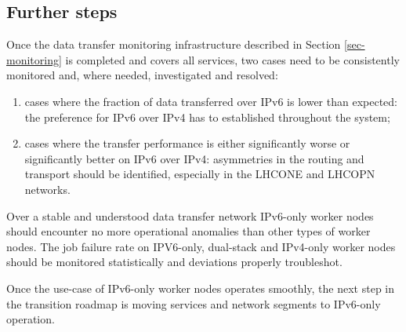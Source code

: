 \subsection{Further steps}
Once the data transfer monitoring infrastructure described in Section
\ref{sec-monitoring} is completed and covers all services, two cases
need to be consistently monitored and, where needed, investigated
and resolved:
\begin{enumerate}
\item cases where the fraction of data transferred over IPv6 is lower than expected:
the preference for IPv6 over IPv4 has to established throughout the system;
\item cases where the transfer performance is either significantly worse 
or significantly better on IPv6 over IPv4: asymmetries in the routing and
transport should be identified, especially in the LHCONE and LHCOPN networks.
\end{enumerate}
\par
Over a stable and understood data transfer network 
IPv6-only worker nodes should encounter no more operational anomalies
than other types of worker nodes. The 
job failure rate on IPV6-only, dual-stack and IPv4-only worker nodes should
be monitored statistically and deviations properly troubleshot.
\par
Once the use-case of IPv6-only worker nodes operates smoothly, the next
step in the transition roadmap is moving services and network segments to
IPv6-only operation.


